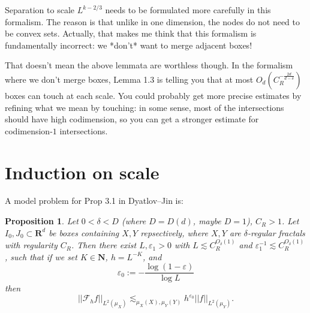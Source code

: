 \documentclass[reqno,10pt]{amsart}
\newcommand{\NN}{\mathbf{N}}
\newcommand{\RR}{\mathbf{R}}
\newtheorem{proposition}[theorem]{Proposition}
\theoremstyle{definition}
\numberwithin{equation}{section}
\begin{document}
Separation to scale $L^{k-2/3}$ needs to be formulated more carefully in this formalism.
The reason is that unlike in one dimension, the nodes do not need to be convex sets. 
Actually, that makes me think that this formalism is fundamentally incorrect: we *don't* want to merge adjacent boxes!

That doesn't mean the above lemmata are worthless though.
In the formalism where we don't merge boxes, Lemma 1.3 is telling you that at most $O_d(C_R^{-\frac{2d}{d - \delta}})$ boxes can touch at each scale.
You could probably get more precise estimates by refining what we mean by touching: in some sense, most of the intersections should have high codimension, so you can get a stronger estimate for codimension-$1$ intersections.

\section{Induction on scale}
A model problem for Prop 3.1 in Dyatlov--Jin is:

\begin{proposition}
Let $0 < \delta < D$ (where $D = D(d)$, maybe $D = 1$), $C_R > 1$.
Let $I_0, J_0 \subset \RR^d$ be boxes containing $X, Y$ repsectively, where $X, Y$ are $\delta$-regular fractals with regularity $C_R$.
Then there exist $L, \varepsilon_1 > 0$ with $L \lesssim C_R^{O_\delta(1)}$ and $\varepsilon_1^{-1} \lesssim C_R^{O_\delta(1)}$, such that if we set $K \in \NN$, $h = L^{-K}$, and
$$\varepsilon_0 := -\frac{\log(1 - \varepsilon)}{\log L}$$
then 
$$||\mathcal F_h f||_{L^2(\mu_X)} \lesssim_{\mu_X(X), \mu_Y(Y)} h^{\varepsilon_0} ||f||_{L^2(\mu_Y)}.$$
\end{proposition}

\printbibliography
\end{document}
